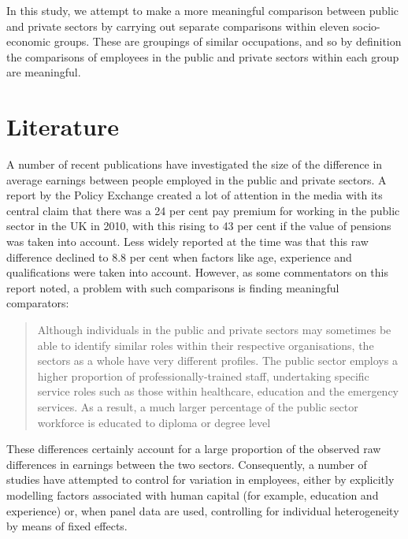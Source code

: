 \documentclass[a4paper,11pt,titlepage]{article}
\begin{document}
In this study, we attempt to make a more meaningful comparison between public and private sectors by carrying out separate comparisons within eleven socio-economic groups.  These are groupings of similar occupations, and so by definition the comparisons of employees in the public and private sectors within each group are meaningful.

\begin{db}
\end{db}

\section{Literature}
A number of recent publications have investigated the size of the difference in average earnings between people employed in the public and private sectors.  A report by the Policy Exchange \citep{Holmes2011} created a lot of attention in the media with its central claim that there was a 24 per cent pay premium for working in the public sector in the UK in 2010, with this rising to 43 per cent if the value of pensions was taken into account.  Less widely reported at the time was that this raw difference declined to 8.8 per cent when factors like age, experience and qualifications were taken into account.  However, as some commentators on this report noted, a problem with such comparisons is finding meaningful comparators:
\begin{quote}
    Although individuals in the public and private sectors may sometimes be able to identify similar roles within their respective organisations, the sectors as a whole have very different profiles. The public sector employs a higher proportion of professionally-trained staff, undertaking specific service roles such as those within healthcare, education and the emergency services. As a result, a much larger percentage of the public sector workforce is educated to diploma or degree level \citep[p.~13]{IDS2011}
\end{quote}
These differences certainly account for a large proportion of the observed raw differences in earnings between the two sectors.  Consequently, a number of studies have attempted to control for variation in employees, either by explicitly modelling factors associated with human capital (for example, education and experience) or, when panel data are used, controlling for individual heterogeneity by means of fixed effects.
\end{document}
